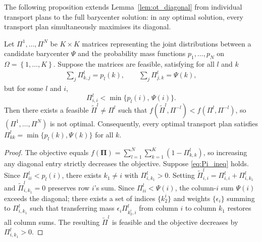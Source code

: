 The following proposition extends Lemma~\ref{lem:ot_diagonal} from individual transport plans to the full barycenter solution: in any optimal solution, every transport plan simultaneously maximises its diagonal.

\begin{proposition}
\label{prop:fulldiag}
Let $\Pi^{1},\ldots,\Pi^{N}$ be $K\times K$ matrices representing the joint distributions between a candidate barycenter $\Psi$ and the probability mass functions $p_1,\ldots,p_N$ on $\Omega=\left\{1,\ldots,K\right\}$.  Suppose the matrices are feasible, satisfying for all $l$ and $k$
\begin{align*}
\sum_{j}\Pi_{k,j}^{l}=p_l(k),\qquad
\sum_{j}\Pi_{j,k}^{l}=\Psi(k),
\end{align*}
but for some $l$ and $i$,
\begin{equation}
\label{eq:Pi_ineq}
\Pi^{l}_{i,i} < \min\bigl\{p_l(i),\,\Psi(i)\bigr\}.
\end{equation}
Then there exists a feasible $\tilde{\Pi}^{l}\neq \Pi^{l}$ such that
$f(\tilde{\Pi}^l,\Pi^{-l}) < f(\Pi^l,\Pi^{-l})$,
so $(\Pi^1,\ldots,\Pi^N)$ is not optimal.  Consequently, every optimal transport plan satisfies $\Pi^{l}_{kk}=\min\{p_l(k),\Psi(k)\}$ for all $k$.
\end{proposition}
\begin{proof}
The objective equals $f(\mathbf{\Pi})= \sum_{l=1}^N \sum_{k=1}^K (1 - \Pi_{k,k}^{l})$, so increasing any diagonal entry strictly decreases the objective.  Suppose \eqref{eq:Pi_ineq} holds.  Since $\Pi^l_{ii} < p_l(i)$, there exists $k_1\neq i$ with $\Pi^l_{i,k_1}>0$.  Setting $\tilde\Pi^l_{i,i}=\Pi^l_{i,i}+\Pi^l_{i,k_1}$ and $\tilde\Pi^l_{i,k_1}=0$ preserves row $i$'s sum.  Since $\Pi^l_{ii}<\Psi(i)$, the column-$i$ sum $\Psi(i)$ exceeds the diagonal; there exists a set of indices $\{k^i_2\}$ and weights $\{\epsilon_i\}$ summing to $\Pi^l_{i,k_1}$ such that transferring mass $\epsilon_i\Pi^l_{k^i_2,i}$ from column $i$ to column $k_1$ restores all column sums.  The resulting $\tilde\Pi^l$ is feasible and the objective decreases by $\Pi^l_{i,k_1}>0$.
\end{proof}


